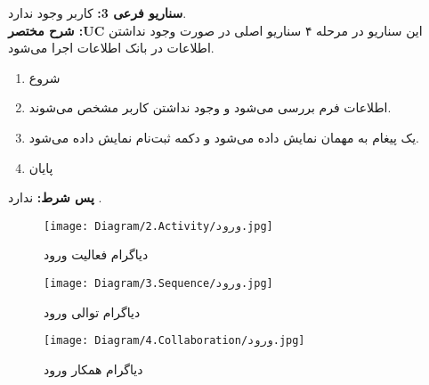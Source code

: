 \noindent
\textbf{سناريو فرعی 3:}
کاربر وجود ندارد.
\\
\textbf{شرح مختصر :UC}
این سناریو در مرحله ۴ سناریو اصلی در صورت وجود نداشتن اطلاعات در بانک اطلاعات اجرا می‌شود.
\begin{enumerate}
	\item
	شروع
	\item
	اطلاعات فرم بررسی می‌شود و وجود نداشتن کاربر مشخص می‌شوند.
	\item
	یک پیغام به مهمان نمایش داده می‌شود و دکمه ثبت‌نام نمایش داده می‌شود.
	\item
	پایان
\end{enumerate}

\noindent
\textbf{پس شرط:}
ندارد .

\begin{figure}[H]
	\centering
	\texttt{[image: Diagram/2.Activity/ورود.jpg]}
	\caption{دیاگرام فعالیت ورود}
	\label{fig:a:ورود}
\end{figure}
\begin{figure}[H]
	\centering
	\texttt{[image: Diagram/3.Sequence/ورود.jpg]}
	\caption{دیاگرام توالی ورود}
	\label{fig:s:ورود}
\end{figure}
\begin{figure}[H]
\centering
\texttt{[image: Diagram/4.Collaboration/ورود.jpg]}
\caption{دیاگرام همکار ورود}
\label{fig:c:ورود}
\end{figure}
